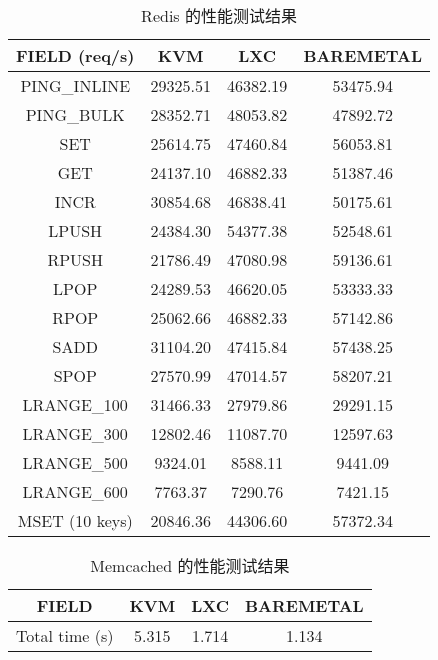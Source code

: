\begin{table}[H]
    \centering
    \caption{Redis 的性能测试结果}
    \begin{tabular}{||c c c c||}
        \hline
        FIELD (req/s) & KVM & LXC & BAREMETAL \\
        \hline
        \hline
        PING\_INLINE & 29325.51 & 46382.19 & 53475.94 \\
        \hline
        PING\_BULK & 28352.71 & 48053.82 & 47892.72 \\
        \hline
        SET & 25614.75 & 47460.84 & 56053.81 \\
        \hline
        GET & 24137.10 & 46882.33 & 51387.46 \\
        \hline
        INCR & 30854.68 & 46838.41 & 50175.61 \\
        \hline
        LPUSH & 24384.30 & 54377.38 & 52548.61 \\
        \hline
        RPUSH & 21786.49 & 47080.98 & 59136.61 \\
        \hline
        LPOP & 24289.53 & 46620.05 & 53333.33 \\
        \hline
        RPOP & 25062.66 & 46882.33 & 57142.86 \\
        \hline
        SADD & 31104.20 & 47415.84 & 57438.25 \\
        \hline
        SPOP & 27570.99 & 47014.57 & 58207.21 \\
        \hline
        LRANGE\_100 & 31466.33 & 27979.86 & 29291.15 \\
        \hline
        LRANGE\_300 & 12802.46 & 11087.70 & 12597.63 \\
        \hline
        LRANGE\_500 & 9324.01 & 8588.11 & 9441.09 \\
        \hline
        LRANGE\_600 & 7763.37 & 7290.76 & 7421.15 \\
        \hline
        MSET (10 keys) & 20846.36 & 44306.60 & 57372.34 \\
        \hline
    \end{tabular}
    \label{tab:redis-perf}
\end{table}

\begin{table}[H]
    \centering
    \caption{Memcached 的性能测试结果}
    \begin{tabular}{||c c c c||}
        \hline
        FIELD & KVM & LXC & BAREMETAL \\
        \hline
        \hline
        Total time (s) & 5.315 & 1.714 & 1.134 \\
        \hline
    \end{tabular}
    \label{tab:memcached-perf}
\end{table}

